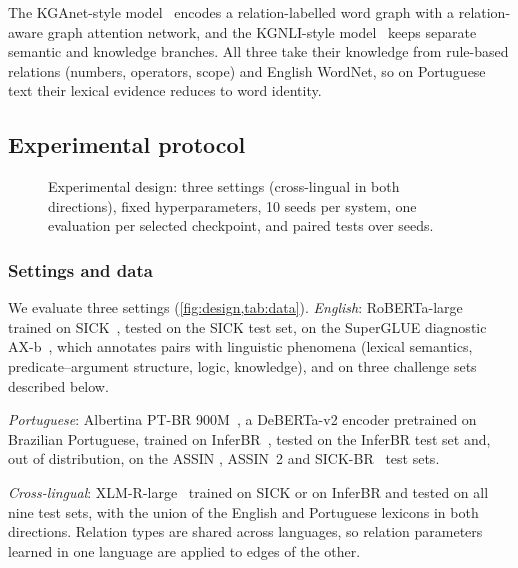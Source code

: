 The KGAnet-style model~\citep{song2020kganet} encodes a relation-labelled word graph with a relation-aware graph attention
network, and the KGNLI-style model~\citep{wang2020knowledge} keeps separate semantic and knowledge branches. All three take their
knowledge from rule-based relations (numbers, operators, scope) and English WordNet, so on Portuguese
text their lexical evidence reduces to word identity.

\subsection{Experimental protocol}
\label{sec:protocol}

\begin{figure}[t]
  \centering
  
  \caption{Experimental design: three settings (cross-lingual in both directions), fixed hyperparameters,
  10 seeds per system, one evaluation per selected checkpoint, and paired tests over seeds.}
  \label{fig:design}
\end{figure}

\subsubsection{Settings and data}
\label{sec:data}

We evaluate three settings (\cref{fig:design,tab:data}).
\emph{English}: RoBERTa-large~\citep{liu2019roberta} trained on SICK~\citep{marelli2014sick}, tested on
the SICK test set, on the SuperGLUE diagnostic AX-b~\citep{wang2019superglue}, which annotates pairs
with linguistic phenomena (lexical semantics, predicate--argument structure, logic, knowledge), and on
three challenge sets described below.

\emph{Portuguese}: Albertina PT-BR 900M~\citep{rodrigues2023albertina}, a DeBERTa-v2 encoder pretrained on
Brazilian Portuguese, trained on InferBR~\citep{bencke2024inferbr}, tested on the InferBR test set and, out of distribution, on the ASSIN
\citep{fonseca2016assin}, ASSIN~2 \citep{real2020assin2} and SICK-BR~\citep{real2018sickbr} test sets.

\emph{Cross-lingual}: XLM-R-large~\citep{conneau2020unsupervised} trained on SICK or on InferBR and tested on
all nine test sets, with the union of the English and Portuguese lexicons in both directions. Relation
types are shared across languages, so relation parameters learned in one language are applied to edges
of the other.

